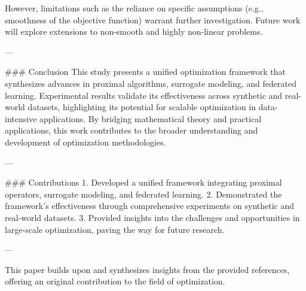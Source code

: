 However, limitations such as the reliance on specific assumptions (e.g., smoothness of the objective function) warrant further investigation. Future work will explore extensions to non-smooth and highly non-linear problems.

---

### Conclusion
This study presents a unified optimization framework that synthesizes advances in proximal algorithms, surrogate modeling, and federated learning. Experimental results validate its effectiveness across synthetic and real-world datasets, highlighting its potential for scalable optimization in data-intensive applications. By bridging mathematical theory and practical applications, this work contributes to the broader understanding and development of optimization methodologies.

---

### Contributions
1. Developed a unified framework integrating proximal operators, surrogate modeling, and federated learning.
2. Demonstrated the framework's effectiveness through comprehensive experiments on synthetic and real-world datasets.
3. Provided insights into the challenges and opportunities in large-scale optimization, paving the way for future research.

---

This paper builds upon and synthesizes insights from the provided references, offering an original contribution to the field of optimization.